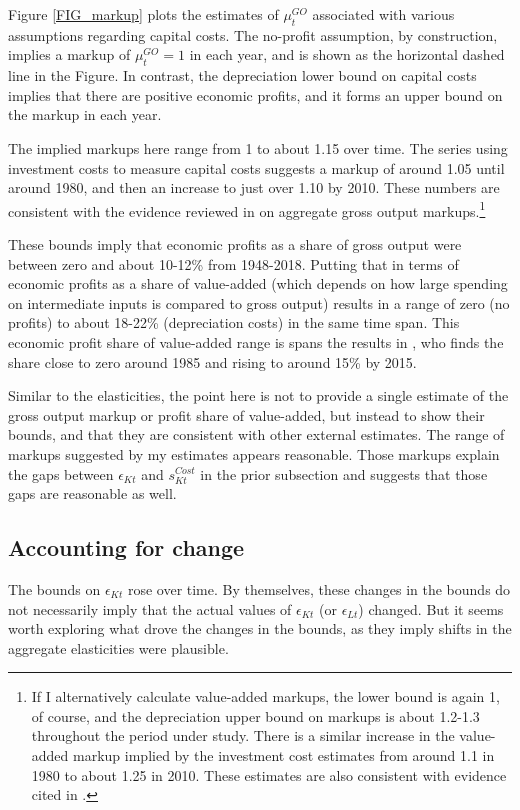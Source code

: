 \documentclass[11pt]{article}
\begin{document}
Figure \ref{FIG_markup} plots the estimates of $\mu^{GO}_t$ associated with various assumptions regarding capital costs. The no-profit assumption, by construction, implies a markup of $\mu^{GO}_t = 1$ in each year, and is shown as the horizontal dashed line in the Figure. In contrast, the depreciation lower bound on capital costs implies that there are positive economic profits, and it forms an upper bound on the markup in each year.

The implied markups here range from 1 to about 1.15 over time. The series using investment costs to measure capital costs suggests a markup of around 1.05 until around 1980, and then an increase to just over 1.10 by 2010. These numbers are consistent with the evidence reviewed in \cite{basu2019} on aggregate gross output markups.\footnote{If I alternatively calculate value-added markups, the lower bound is again 1, of course, and the depreciation upper bound on markups is about 1.2-1.3 throughout the period under study. There is a similar increase in the value-added markup implied by the investment cost estimates from around 1.1 in 1980 to about 1.25 in 2010. These estimates are also consistent with evidence cited in \cite{basu2019}.}

These bounds imply that economic profits as a share of gross output were between zero and about 10-12\% from 1948-2018. Putting that in terms of economic profits as a share of value-added (which depends on how large spending on intermediate inputs is compared to gross output) results in a range of zero (no profits) to about 18-22\% (depreciation costs) in the same time span. This economic profit share of value-added range is spans the results in \cite{Barkai000}, who finds the share close to zero around 1985 and rising to around 15\% by 2015. 

Similar to the elasticities, the point here is not to provide a single estimate of the gross output markup or profit share of value-added, but instead to show their bounds, and that they are consistent with other external estimates. The range of markups suggested by my estimates appears reasonable. Those markups explain the gaps between $\epsilon_{Kt}$ and $s^{Cost}_{Kt}$ in the prior subsection and suggests that those gaps are reasonable as well.

\subsection{Accounting for change}
The bounds on $\epsilon_{Kt}$ rose over time. By themselves, these changes in the bounds do not necessarily imply that the actual values of $\epsilon_{Kt}$ (or $\epsilon_{Lt}$) changed. But it seems worth exploring what drove the changes in the bounds, as they imply shifts in the aggregate elasticities were plausible.
\end{document}
